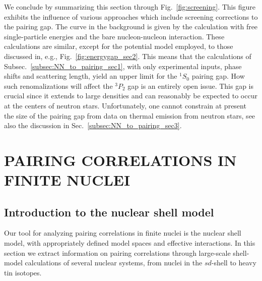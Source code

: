 \documentclass[rmp,aps,floatfix]{revtex4}
\begin{document}
We conclude by summarizing this section through 
Fig.~\ref{fig:screening}. 
This figure exhibits the influence of various
approaches which include 
screening corrections  to the pairing gap. 
The curve in the background is given by the  
calculation with free single-particle energies and the bare nucleon-nucleon
interaction. 
These calculations are similar,
except for the potential model employed, to those discussed in,
e.g., Fig.~\ref{fig:energygap_sec2}.  
This means that the calculations of Subsec.~\ref{subsec:NN_to_pairing_sec1}, 
with only experimental inputs, phase shifts and scattering length, 
yield an upper limit for the $^1S_0$ pairing gap. 
How such renomalizations will affect the $^3P_2$ gap is an entirely open issue.
This gap is crucial since it extends to large densities 
and can reasonably be expected to occur at the centers of neutron
stars.  Unfortunately, one cannot constrain at present 
the size of the pairing gap
from  data on thermal emission from neutron stars, see also the discussion
in Sec.~\ref{subsec:NN_to_pairing_sec3}.




%
\section{PAIRING CORRELATIONS IN FINITE NUCLEI}

\label{sec:pairing_correlations}

\subsection{Introduction to the nuclear shell model}

Our tool for analyzing pairing correlations in finite nuclei
is the nuclear shell model, with appropriately defined model spaces
and effective interactions. In this section we extract information
on pairing correlations through large-scale  
shell-model calculations of
several nuclear systems, from nuclei in the $sd$-shell to 
heavy tin isotopes. 
\end{document}
